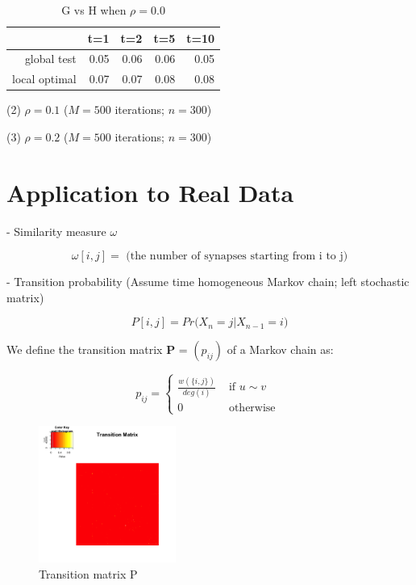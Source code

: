\documentclass[12pt]{report}
\begin{document}
\begin{table}[ht]
\centering
\begin{tabular}{rrrrr}
  \hline
 & t=1 & t=2 & t=5 & t=10 \\ 
  \hline
global test & 0.05 & 0.06 & 0.06 & 0.05 \\ 
  local optimal & 0.07 & 0.07 & 0.08 & 0.08 \\ 
   \hline
\end{tabular}
\caption{G vs H when $\rho = 0.0$}
\end{table}


\newpage
(2) $\rho = 0.1$ ($M = 500$ iterations; $n = 300$)

\newpage
(3) $\rho = 0.2$ ($M = 500$ iterations; $n = 300$)





\newpage
\section{Application to Real Data}

- Similarity measure $\omega$

$$\omega[i,j] = \mbox{ (the number of synapses starting from i to j)}$$
 

- Transition probability (Assume time homogeneous Markov chain; left stochastic matrix)

$$P[i,j] = Pr\big( X_{n} = j  | X_{n-1} = i \big)$$

We define the transition matrix \textbf{P} = $(p_{ij})$ of a Markov chain as:

$$p_{ij} = \left\{ \begin{array}{ll} \frac{w(\{ i, j\})}{ deg(i) } & \mbox{ if } u \sim v \\ 0 & \mbox{ otherwise }  \end{array}  \right.$$


\begin{figure}[H]
\captionsetup{format=plain}
\centering
\includegraphics[width=0.4\textwidth]{../figure/trans.png}
\caption{Transition matrix P}
\label{fig:trans}
\end{figure}
\end{document}
